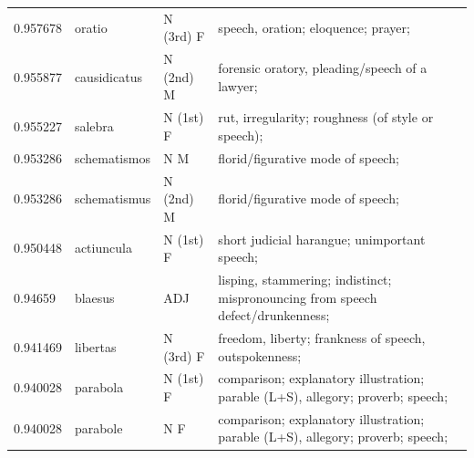 \documentclass[]{article}
\begin{document}
\begin{table}
\begin{tabular}{l|lll}
	   0.957678 & oratio & N (3rd) F & speech, oration; eloquence; prayer;\\
	   0.955877 & causidicatus & N (2nd) M & forensic oratory, pleading/speech of a lawyer;\\
	   0.955227 & salebra & N (1st) F & rut, irregularity; roughness (of style or speech);\\
	   0.953286 & schematismos & N M & florid/figurative mode of speech;\\
	   0.953286 & schematismus & N (2nd) M & florid/figurative mode of speech;\\
	   0.950448 & actiuncula & N (1st) F & short judicial harangue; unimportant speech;\\
	   0.94659 & blaesus & ADJ & lisping, stammering; indistinct; mispronouncing from speech defect/drunkenness;\\
	   0.941469 & libertas & N (3rd) F & freedom, liberty; frankness of speech, outspokenness;\\
	   0.940028 & parabola & N (1st) F & comparison; explanatory illustration; parable (L+S), allegory; proverb; speech;\\
	   0.940028 & parabole & N F & comparison; explanatory illustration; parable (L+S), allegory; proverb; speech;\\
	\end{tabular}
	\end{table}
\end{document}
